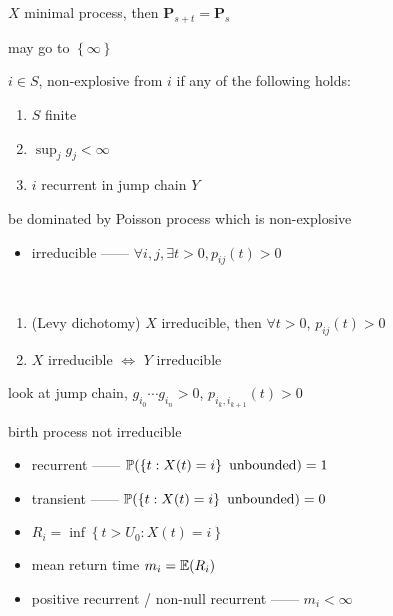 \begin{prop}
    $X$ minimal process, then $\textbf{P}_{s+t} = \textbf{P}_s$
\end{prop}
\begin{pf}
    may go to $\left\{ \infty \right\}$
\end{pf}

\begin{thm}
    $i \in S$, non-explosive from $i$ if any of the following holds:
    \begin{enumerate}
        \item $S$ finite
        \item $\sup_j g_j < \infty$
        \item $i$ recurrent in jump chain $Y$
    \end{enumerate}
\end{thm}
\begin{pf}
    be dominated by Poisson process which is non-explosive
\end{pf}

\begin{itemize}
    \item irreducible ------ $\forall i,j, \exists t > 0, p_{ij}(t) > 0$
\end{itemize}

\begin{thm}\,
    \begin{enumerate}
        \item (Levy dichotomy) $X$ irreducible, then $\forall t > 0$, $p_{ij}(t) > 0$
        \item $X$ irreducible $\iff$ $Y$ irreducible
    \end{enumerate}
\end{thm}
\begin{pf}
    look at jump chain, $g_{i_0}\cdots g_{i_n} > 0$, $p_{i_k, i_{k+1}}(t) > 0$
\end{pf}

\begin{fact}
    birth process not irreducible
\end{fact}

\begin{itemize}
    \item recurrent ------ $\mathbb{P}(\left\{ t: X(t) = i \right\} \text{ unbounded}) = 1$
    \item transient ------ $\mathbb{P}(\left\{ t: X(t) = i \right\} \text{ unbounded}) = 0$
    \item $R_i = \inf \left\{ t > U_0 : X(t) = i \right\}$
    \item mean return time $m_i = \mathbb{E}(R_i)$
    \item positive recurrent / non-null recurrent ------ $m_i < \infty$
\end{itemize}

